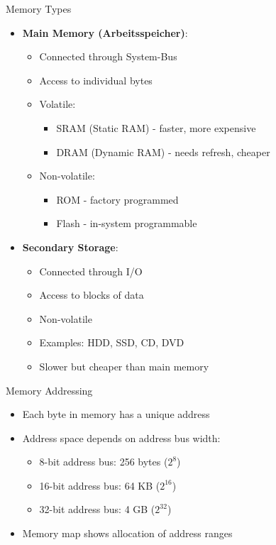 \begin{concept}{Memory Types}
\begin{itemize}
  \item \textbf{Main Memory (Arbeitsspeicher)}:
    \begin{itemize}
      \item Connected through System-Bus
      \item Access to individual bytes
      \item Volatile: 
        \begin{itemize}
          \item SRAM (Static RAM) - faster, more expensive
          \item DRAM (Dynamic RAM) - needs refresh, cheaper
        \end{itemize}
      \item Non-volatile: 
        \begin{itemize}
          \item ROM - factory programmed
          \item Flash - in-system programmable
        \end{itemize}
    \end{itemize}
  \item \textbf{Secondary Storage}:
    \begin{itemize}
      \item Connected through I/O
      \item Access to blocks of data
      \item Non-volatile
      \item Examples: HDD, SSD, CD, DVD
      \item Slower but cheaper than main memory
    \end{itemize}
\end{itemize}
\end{concept}

\begin{definition}{Memory Addressing}\\
\begin{itemize}
  \item Each byte in memory has a unique address
  \item Address space depends on address bus width:
    \begin{itemize}
      \item 8-bit address bus: 256 bytes ($2^8$)
      \item 16-bit address bus: 64 KB ($2^{16}$)
      \item 32-bit address bus: 4 GB ($2^{32}$)
    \end{itemize}
  \item Memory map shows allocation of address ranges
\end{itemize}
\end{definition}

